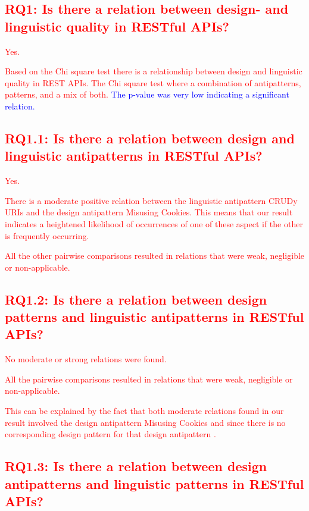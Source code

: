 \subsection{\textcolor{red}{RQ1: Is there a relation between design- and linguistic quality in RESTful APIs?}}

\textcolor{red}{Yes.}

\textcolor{red}{Based on the Chi square test there is a relationship between design and linguistic quality in REST APIs. The Chi square test where a combination of antipatterns, patterns, and a mix of both.} \textcolor{blue}{The p-value was very low indicating a significant relation.}

\subsection{\textcolor{red}{RQ1.1: Is there a relation between design and linguistic antipatterns in RESTful APIs?}}

\textcolor{red}{Yes.}

\textcolor{red}{
There is a moderate positive relation between the linguistic antipattern CRUDy URIs and the design antipattern Misusing Cookies. This means that our result indicates a heightened likelihood of occurrences of one of these aspect if the other is frequently occurring. 
}

\textcolor{red}{
All the other pairwise comparisons resulted in relations that were weak, negligible or non-applicable. 
}

\subsection{\textcolor{red}{RQ1.2: Is there a relation between design patterns and linguistic antipatterns in RESTful APIs?}}

\textcolor{red}{No moderate or strong relations were found.}

\textcolor{red}{
All the pairwise comparisons resulted in relations that were weak, negligible or non-applicable. 
}

\textcolor{red}{
This can be explained by the fact that both moderate relations found in our result involved the design antipattern Misusing Cookies and since there is no corresponding design pattern for that design antipattern \cite{design}.
}

\subsection{\textcolor{red}{RQ1.3: Is there a relation between design antipatterns and linguistic patterns in RESTful APIs?}}

